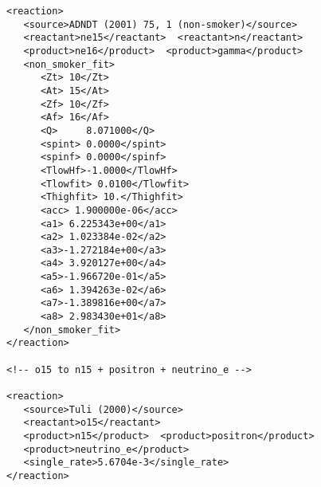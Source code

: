 \documentclass{article}    %
\begin{document}
\begin{verbatim}
<reaction>
   <source>ADNDT (2001) 75, 1 (non-smoker)</source>
   <reactant>ne15</reactant>  <reactant>n</reactant>
   <product>ne16</product>  <product>gamma</product>
   <non_smoker_fit>
      <Zt> 10</Zt>
      <At> 15</At>
      <Zf> 10</Zf>
      <Af> 16</Af>
      <Q>     8.071000</Q>
      <spint> 0.0000</spint>
      <spinf> 0.0000</spinf>
      <TlowHf>-1.0000</TlowHf>
      <Tlowfit> 0.0100</Tlowfit>
      <Thighfit> 10.</Thighfit>
      <acc> 1.900000e-06</acc>
      <a1> 6.225343e+00</a1>
      <a2> 1.023384e-02</a2>
      <a3>-1.272184e+00</a3>
      <a4> 3.920127e+00</a4>
      <a5>-1.966720e-01</a5>
      <a6> 1.394263e-02</a6>
      <a7>-1.389816e+00</a7>
      <a8> 2.983430e+01</a8>
   </non_smoker_fit>
</reaction>

<!-- o15 to n15 + positron + neutrino_e -->

<reaction>
   <source>Tuli (2000)</source>
   <reactant>o15</reactant>
   <product>n15</product>  <product>positron</product>
   <product>neutrino_e</product>
   <single_rate>5.6704e-3</single_rate>
</reaction>


\end{verbatim}
\end{document}
